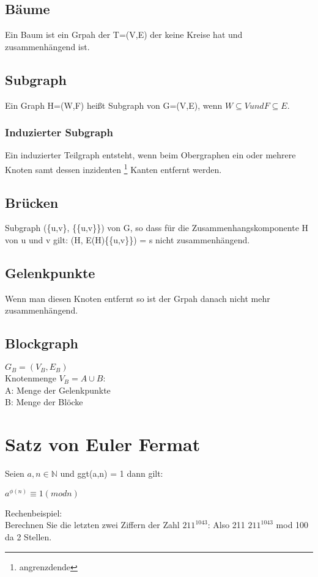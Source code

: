 \documentclass[12pt, letterpaper, twoside]{article}
\begin{document}
\subsection{Bäume}
Ein Baum ist ein Grpah der T=(V,E) der keine Kreise hat und zusammenhängend ist. 

\subsection{Subgraph}
Ein Graph H=(W,F) heißt Subgraph von G=(V,E), wenn $ W \subseteq V und F \subseteq E $.

\subsubsection{Induzierter Subgraph}
Ein induzierter Teilgraph entsteht, wenn beim Obergraphen ein oder mehrere Knoten samt dessen inzidenten \footnote{angrenzdende} Kanten entfernt werden. 

\subsection{Brücken}
Subgraph (\{u,v\}, \{\{u,v\}\}) von G, so dass für die Zusammenhangskomponente H von u und v gilt: (H, E(H)\{\{u,v\}\}) = s nicht zusammenhängend.

\subsection{Gelenkpunkte}
Wenn man diesen Knoten entfernt so ist der Grpah danach nicht mehr zusammenhängend.

\subsection{Blockgraph}
$ G_B =( V_B, E_B) $ \\
Knotenmenge $V_B = A \cup B$: \\
A: Menge der Gelenkpunkte \\
B: Menge der Blöcke

\section{Satz von Euler Fermat}
Seien $ a,n \in  \mathbb{N} $ und ggt(a,n) = 1 dann gilt: \\
\begin{center}
$ a^{\phi (n)} \equiv 1 (mod n) $ \\
\end{center}
Rechenbeispiel: \\
Berechnen Sie die letzten zwei Ziffern der Zahl $ 211^{1043} $:
Also 211 $ 211^{1043} $ mod 100 da 2 Stellen.
\end{document}
